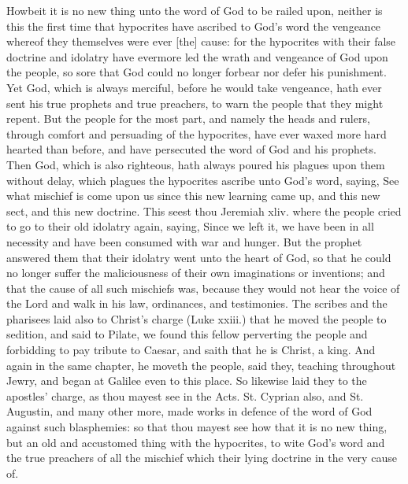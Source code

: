 Howbeit it is no new thing unto the word of God to be 
railed upon, neither is this the first time that hypocrites
have ascribed to God's word the vengeance whereof they 
themselves were ever [the] cause: for the hypocrites with
their false doctrine and idolatry have evermore led the wrath
and vengeance of God upon the people, so sore that God
could no longer forbear nor defer his punishment. Yet 
God, which is always merciful, before he would take vengeance,
hath ever sent his true prophets and true preachers, 
to warn the people that they might repent. But the people
for the most part, and namely the heads and rulers, through 
comfort and persuading of the hypocrites, have ever waxed 
more hard hearted than before, and have persecuted the 
word of God and his prophets. Then God, which is 
also righteous, hath always poured his plagues upon
them without delay, which plagues the hypocrites 
ascribe unto God's word, saying, See what mischief 
is come upon us since this new learning came up, and this 
new sect, and this new doctrine. This seest thou Jeremiah
xliv. where the people cried to go to their old idolatry
again, saying, Since we left it, we have been in all necessity
and have been consumed with war and hunger. But 
the prophet answered them that their idolatry went unto the 
heart of God, so that he could no longer suffer the maliciousness
of their own imaginations or inventions; and that 
the cause of all such mischiefs was, because they would not 
hear the voice of the Lord and walk in his law, ordinances, 
and testimonies. The scribes and the pharisees laid also 
to Christ's charge (Luke xxiii.) that he moved the 
people to sedition, and said to Pilate, we found this fellow
perverting the people and forbidding to pay tribute to 
Caesar, and saith that he is Christ, a king. And again in the
same chapter, he moveth the people, said they, teaching 
throughout Jewry, and began at Galilee even to this place. 
So likewise laid they to the apostles' charge, as thou mayest 
see in the Acts. St. Cyprian also, and St. Augustin, and 
many other more, made works in defence of the word of 
God against such blasphemies: so that thou mayest see 
how that it is no new thing, but an old and accustomed 
thing with the hypocrites, to wite God's word and the 
true preachers of all the mischief which their lying doctrine
in the very cause of.

